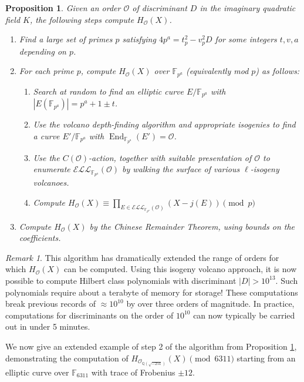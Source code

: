 \documentclass{amsart}
\newtheorem{prop}[thm]{Proposition}
\theoremstyle{definition}
\theoremstyle{remark}
\newtheorem{remark}[thm]{Remark}
\numberwithin{equation}{section}
\newcommand{\cE}{\mathcal E}
\newcommand{\cL}{\mathcal L}
\newcommand{\cO}{\mathcal O}
\newcommand{\bbF}{\mathbb F}
\newcommand{\bbQ}{\mathbb Q}
\newcommand{\ELL}{\cE\cL\cL}
\DeclareMathOperator{\End}{End}
\begin{document}
\begin{prop} \label{prop:AlgorithmForHilbertPoly}
Given an order $\cO$ of discriminant $D$ in the imaginary quadratic field $K$, the following steps compute $H_{\cO}(X)$.
\begin{enumerate}
\item Find a large set of primes $p$ satisfying $4p^a = t_{p}^2 - v_{p}^2 D$ for some integers $t,v,a$ depending on $p$.
\item For each prime $p$, compute $H_{\cO}(X)$ over $\bbF_{p^a}$ (equivalently mod $p$) as follows:
\begin{enumerate}
\item Search at random to find an elliptic curve $E/\bbF_{p^a}$ with $|E(\bbF_{p^a})| = p^a + 1 \pm t$.
\item Use the volcano depth-finding algorithm and appropriate isogenies to find a curve $E'/\bbF_{p^a}$ with $\End_{\bbF_{p^a}}(E') = \cO$.
\item Use the $C(\cO)$-action, together with suitable presentation of $\cO$ to enumerate $\ELL_{\bbF_{p^a}}(\cO)$ by walking the surface of various $\ell$-isogeny volcanoes.
\item Compute $H_{\cO}(X) \equiv \prod_{E \in \ELL_{\bbF_{p^a}}(\cO)} (X - j(E)) \pmod{p}$
\end{enumerate}
\item Compute $H_{\cO}(X)$ by the Chinese Remainder Theorem, using bounds on the coefficients.
\end{enumerate}
\end{prop}

\begin{remark}
 This algorithm has dramatically extended the range of orders for which $H_{\cO}(X)$ can be computed. Using this isogeny volcano approach, it is now possible to compute Hilbert class polynomials with discriminant $|D| > 10^{13}$. Such polynomials require about a terabyte of memory for storage! These computations break previous records of $\approx 10^{10}$ by over three orders of magnitude. In practice, computations for discriminants on the order of $10^{10}$ can now typically be carried out in under 5 minutes.
\end{remark}

We now give an extended example of step 2 of the algorithm from Proposition \ref{prop:AlgorithmForHilbertPoly}, demonstrating the computation of $H_{\cO_{\bbQ(\sqrt{-251})}}(X) \pmod{6311}$ starting from an elliptic curve over $\bbF_{6311}$ with trace of Frobenius $\pm 12$.
\end{document}
